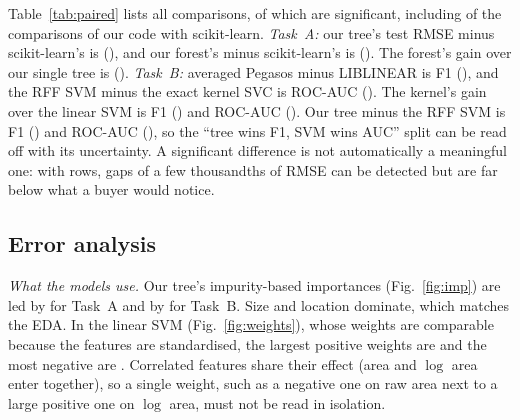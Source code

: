 \documentclass[10pt,twocolumn,a4paper]{article}
\newcommand{\gen}[1]{}
\newcommand{\fit}[1]{\resizebox{\ifdim\width>\linewidth\linewidth\else\width\fi}{!}{#1}}
\begin{document}
Table~\ref{tab:paired} lists all \PairedN{} comparisons, of which
\PairedNSig{} are significant, including \PairedNOursVsSkSig{} of the
\PairedNOursVsSk{} comparisons of our code with scikit-learn.
\emph{Task~A:} our tree's test RMSE minus scikit-learn's is
\PairedAOurTreeVsSklearnTreeRMSEDiff{} \PairedAOurTreeVsSklearnTreeRMSECI{}
(\PairedAOurTreeVsSklearnTreeRMSEWord), and our forest's minus
scikit-learn's is \PairedAOurForestVsSklearnForestRMSEDiff{}
\PairedAOurForestVsSklearnForestRMSECI{}
(\PairedAOurForestVsSklearnForestRMSEWord). The forest's gain over our
single tree is \PairedAOurForestVsOurSingleTreeRMSEDiff{}
\PairedAOurForestVsOurSingleTreeRMSECI{}
(\PairedAOurForestVsOurSingleTreeRMSEWord).
\emph{Task~B:} averaged Pegasos minus LIBLINEAR is
\PairedBPegasosVsLinearSVCFOneDiff{} F1 \PairedBPegasosVsLinearSVCFOneCI{}
(\PairedBPegasosVsLinearSVCFOneWord), and the RFF SVM minus the exact
kernel SVC is \PairedBRFFSVMVsSVCRBFAUCDiff{} ROC-AUC
\PairedBRFFSVMVsSVCRBFAUCCI{} (\PairedBRFFSVMVsSVCRBFAUCWord). The
kernel's gain over the linear SVM is \PairedBRFFSVMVsPegasosFOneDiff{} F1
(\PairedBRFFSVMVsPegasosFOneWord) and \PairedBRFFSVMVsPegasosAUCDiff{}
ROC-AUC (\PairedBRFFSVMVsPegasosAUCWord). Our tree minus the RFF SVM is
\PairedBOurTreeVsRFFSVMFOneDiff{} F1 (\PairedBOurTreeVsRFFSVMFOneWord)
and \PairedBOurTreeVsRFFSVMAUCDiff{} ROC-AUC
(\PairedBOurTreeVsRFFSVMAUCWord), so the ``tree wins F1, SVM wins AUC''
split can be read off with its uncertainty. A significant difference is
not automatically a meaningful one: with \NTest{} rows, gaps of a few
thousandths of RMSE can be detected but are far below what a buyer would
notice.

\begin{table}[tp]
  \centering
  \caption{Paired bootstrap comparisons on the test split. Difference =
  first $-$ second (lower is better for RMSE, higher for F1 and ROC-AUC;
  $R^2$ is omitted because on a fixed test sample it is a monotone function
  of RMSE), with its 95\% percentile interval over \NBoot{} resamples of
  the test rows. ``No real difference'': the interval contains~0.}
  \label{tab:paired}
  \fit{\gen{tab_paired}}
\end{table}

\subsection{Error analysis}
\emph{What the models use.} Our tree's impurity-based importances
(Fig.~\ref{fig:imp}) are led by \TopFeatReg{} for Task~A and by
\TopFeatClf{} for Task~B. Size and location dominate, which matches the
EDA. In the linear SVM (Fig.~\ref{fig:weights}), whose weights are comparable because the
features are standardised, the largest positive weights are
\SVMPosWeights{} and the most negative are \SVMNegWeights. Correlated
features share their effect (area and $\log$ area enter together), so a
single weight, such as a negative one on raw area next to a large positive
one on $\log$ area, must not be read in isolation.
\end{document}
